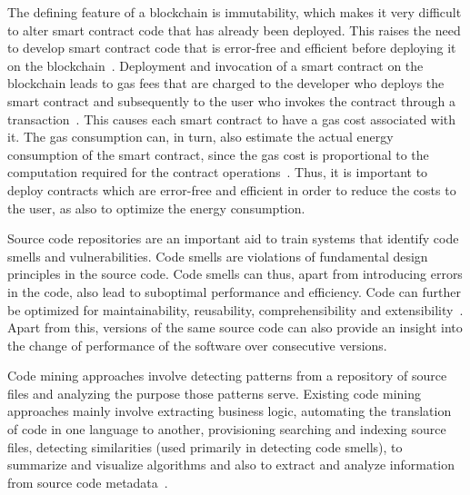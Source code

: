 \documentclass[10pt,conference]{IEEEtran}
\begin{document}
	The defining feature of a blockchain is immutability, which makes it very difficult to alter smart contract code that has already been deployed. This raises the need to develop smart contract code that is error-free and efficient before deploying it on the blockchain~\cite{brandstatter}. Deployment and invocation of a smart contract on the blockchain leads to gas fees that are charged to the developer who deploys the smart contract and subsequently to the user who invokes the contract through a transaction~\cite{ethpaper}. This causes each smart contract to have a gas cost associated with it. The gas consumption can, in turn, also estimate the actual energy consumption of the smart contract, since the gas cost is proportional to the computation required for the contract operations~\cite{contractenergyconsumptionthesis}. Thus, it is important to deploy contracts which are error-free and efficient in order to reduce the costs to the user, as also to optimize the energy consumption. 
	
	Source code repositories are an important aid to train systems that identify code smells and vulnerabilities. Code smells  are violations of fundamental design principles in the source code. Code smells can thus, apart from introducing errors in the code, also lead to suboptimal performance and efficiency. Code can further be optimized for maintainability, reusability, comprehensibility and extensibility~\cite{codesmellmining}. Apart from this, versions of the same source code can also provide an insight into the change of performance of the software over consecutive versions\cite{softwareversion}. 
	
	Code mining approaches involve detecting patterns from a repository of source files and analyzing the purpose those patterns serve. Existing code mining approaches mainly involve extracting business logic, automating the translation of code in one language to another, provisioning searching and indexing source files, detecting similarities (used primarily in detecting code smells), to summarize and visualize algorithms and also to extract and analyze information from source code metadata~\cite{codeminingsurvey}.
	
\end{document}

